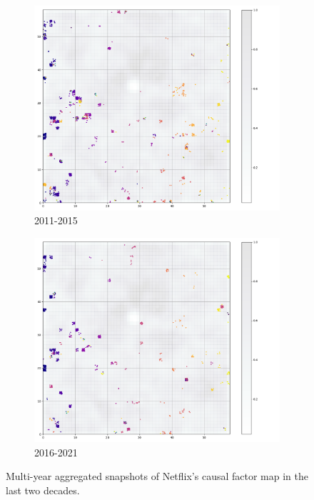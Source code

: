 \begin{figure}
     \hfill
     \begin{subfigure}[b]{0.45\textwidth}
         \centering
         \includegraphics[width=\textwidth]{figures/NFLX_1015.png}
         \caption{2011-2015}
     \end{subfigure}
     \hfill
     \begin{subfigure}[b]{0.45\textwidth}
         \centering
         \includegraphics[width=\textwidth]{figures/NFLX_1521.png}
         \caption{2016-2021}
     \end{subfigure}

        \caption{Multi-year aggregated snapshots of Netflix's causal factor map in the last two decades.}
        \label{fig:netflix5yrs}

\end{figure}

